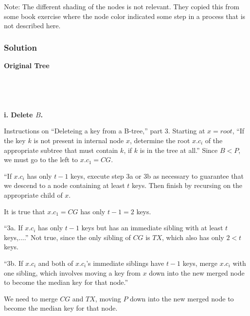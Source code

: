 	Note:  The different shading of the nodes is not relevant.  They copied this from some book exercise where the node color indicated some step in a process that is not described here.  
	
\subsubsection{Solution}

{\bf Original Tree}

\
	
\hfil{}

\

{\bf i. Delete $B$.}

Instructions on ``Deleteing a key from a B-tree,'' part 3.  Starting at $x = root$, ``If the key $k$ is not present in internal node $x$, determine the root $x.c_i$ of the appropriate subtree that must contain $k$, if $k$ is in the tree at all.''  Since $B<P$, we must go to the left to $x.c_1 = CG$.    

``If $x.c_i$ has only $t-1$ keys, execute step 3a or 3b as necessary to guarantee that we descend to a node containing at least $t$ keys.  Then finish by recursing on the appropriate child of $x$.  

It is true that $x.c_1 = CG$ has only $t-1=2$ keys.  

``3a.  If $x.c_i$ has only $t-1$ keys but has an immediate sibling with at least $t$ keys,....''  Not true, since the only sibling of $CG$ is $TX$, which also has only $2<t$ keys.  

``3b.  If  $x.c_i$ and both of $x.c_i$'s immediate siblings have $t-1$ keys, merge $x.c_i$ with one sibling, which involves moving a key from $x$ down into the new merged node to become the median key for that node.''

We need to merge $CG$ and $TX$, moving $P$ down into the new merged node to become the median key for that node.  



